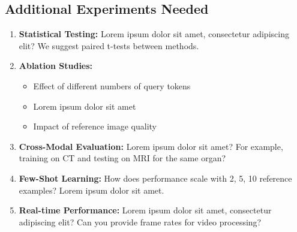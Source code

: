 \subsection{Additional Experiments Needed}
\begin{enumerate}
    \item \textbf{Statistical Testing:} Lorem ipsum dolor sit amet, consectetur adipiscing elit? We suggest paired t-tests between methods.
    
    \item \textbf{Ablation Studies:}
    \begin{itemize}
        \item Effect of different numbers of query tokens
        \item Lorem ipsum dolor sit amet
        \item Impact of reference image quality
    \end{itemize}
    
    \item \textbf{Cross-Modal Evaluation:} Lorem ipsum dolor sit amet? For example, training on CT and testing on MRI for the same organ?
    
    \item \textbf{Few-Shot Learning:} How does performance scale with 2, 5, 10 reference examples? Lorem ipsum dolor sit amet.
    
    \item \textbf{Real-time Performance:} Lorem ipsum dolor sit amet, consectetur adipiscing elit? Can you provide frame rates for video processing?
\end{enumerate}

